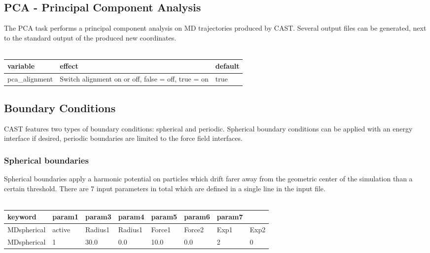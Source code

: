 \documentclass[10pt,a4paper]{article} %
\newif\ifdevmode %
\begin{document}
{\begin{tabularx}{\textwidth}{l|X|X}
	\end{tabularx}
	\ifdevmode
	\colorbox{red}{HERE IS STILL WORK TO BE DONE}
	\fi

	\subsection{PCA - Principal Component Analysis}
	The PCA task performs a principal component analysis on MD trajectories produced by CAST. Several output files can be generated, next to the standard output of the produced new coordinates. \\~\\

	\begin{tabularx}{\textwidth}{l|X|X}
		variable & effect & default  \\
		\hline
		pca_alignment & Switch alignment on or off, false = off, true = on & true\\

	\end{tabularx}
	\ifdevmode
	\colorbox{red}{HERE IS STILL WORK TO BE DONE}
	\fi

	\subsection{Boundary Conditions}

	\ifdevmode \colorbox{red}{We should put this section somewhere else, not as a subsection of TASKS...} \fi

	CAST features two types of boundary conditions: spherical and periodic. Spherical boundary conditions can be applied with an energy interface if desired, periodic boundaries are limited to the force field interfaces.

	\subsubsection{Spherical boundaries}
	Spherical boundaries apply a harmonic potential on particles which drift farer away from the geometric center of the simulation than a certain threshold. There are 7 input parameters in total which are defined in a single line in the input file. \\~\\

	\begin{tabularx}{\textwidth}{l|X|X|X|X|X|X|X}
		keyword & param1 & param3 & param4 & param5 & param6 & param7 \\
		\hline
		MDspherical & active & Radius1 & Radius1 & Force1 & Force2 & Exp1 & Exp2 \\
		MDspherical & 1 & 30.0 & 0.0 & 10.0 & 0.0 & 2 & 0 \\
	\end{tabularx}~\\

}
\end{document}
